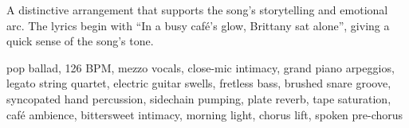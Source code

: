 

\begin{notes}
A distinctive arrangement that supports the song's storytelling and emotional arc. %
The lyrics begin with “In a busy café’s glow, Brittany sat alone”, giving a quick sense of the song’s tone.
\end{notes}

\begin{style}
pop ballad, 126 BPM, mezzo vocals, close-mic intimacy, grand piano arpeggios, legato string quartet, electric guitar swells, fretless bass, brushed snare groove, syncopated hand percussion, sidechain pumping, plate reverb, tape saturation, café ambience, bittersweet intimacy, morning light, chorus lift, spoken pre-chorus
\end{style}

